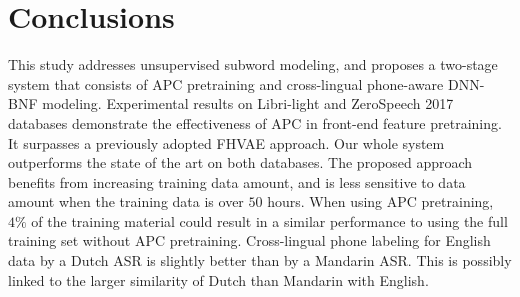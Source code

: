 \documentclass[a4paper]{article}
\begin{document}


\section{Conclusions}
This study addresses unsupervised subword modeling, and proposes a two-stage system that consists of APC pretraining and cross-lingual phone-aware DNN-BNF modeling.  
Experimental results on Libri-light and ZeroSpeech 2017 databases demonstrate the effectiveness of APC in front-end feature pretraining. It surpasses a previously adopted FHVAE approach. Our whole system outperforms the state of the art on both databases. The proposed approach benefits from increasing training data amount, and is less sensitive to data amount when the training data is over $50$ hours. 
When using APC pretraining, $4\%$ of the training material could result in a similar   performance to   using the full training set without  APC pretraining.
Cross-lingual phone labeling for English data by a Dutch ASR is slightly better than by a Mandarin ASR. This is possibly linked to the larger similarity of Dutch than Mandarin with  English.  








\end{document}
